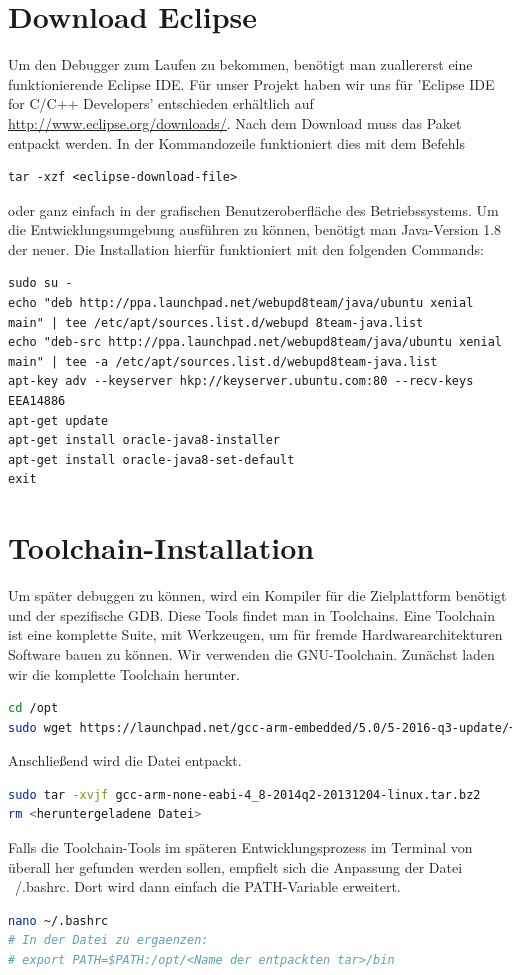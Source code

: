 \section{Download Eclipse}
Um den Debugger zum Laufen zu bekommen, benötigt man zuallererst eine funktionierende Eclipse IDE. Für unser Projekt haben wir uns für 'Eclipse IDE for C/C++ Developers' entschieden erhältlich auf \url{http://www.eclipse.org/downloads/}.
Nach dem Download muss das Paket entpackt werden. In der Kommandozeile funktioniert dies mit dem Befehls 
\begin{lstlisting} 
tar -xzf <eclipse-download-file>
\end{lstlisting}
oder ganz einfach in der grafischen Benutzeroberfläche des Betriebssystems.
Um die Entwicklungsumgebung ausführen zu können, benötigt man Java-Version 1.8 der neuer. 
Die Installation hierfür funktioniert mit den folgenden Commands:
\begin{lstlisting}
sudo su -
echo "deb http://ppa.launchpad.net/webupd8team/java/ubuntu xenial main" | tee /etc/apt/sources.list.d/webupd 8team-java.list
echo "deb-src http://ppa.launchpad.net/webupd8team/java/ubuntu xenial main" | tee -a /etc/apt/sources.list.d/webupd8team-java.list
apt-key adv --keyserver hkp://keyserver.ubuntu.com:80 --recv-keys EEA14886
apt-get update
apt-get install oracle-java8-installer
apt-get install oracle-java8-set-default
exit

\end{lstlisting}
\section{Toolchain-Installation}
Um später debuggen zu können, wird ein Kompiler für die Zielplattform benötigt und der spezifische GDB. Diese Tools findet man in Toolchains. Eine Toolchain ist eine komplette Suite, mit Werkzeugen, um für fremde Hardwarearchitekturen Software bauen zu können.
Wir verwenden die GNU-Toolchain. Zunächst laden wir die komplette Toolchain herunter.
\begin{lstlisting}[language=sh]
cd /opt
sudo wget https://launchpad.net/gcc-arm-embedded/5.0/5-2016-q3-update/+download/gcc-arm-none-eabi-5_4-2016q3-20160926-linux.tar.bz2
\end{lstlisting}
Anschließend wird die Datei entpackt.
\begin{lstlisting}[language=sh]
sudo tar -xvjf gcc-arm-none-eabi-4_8-2014q2-20131204-linux.tar.bz2
rm <heruntergeladene Datei>
\end{lstlisting}
Falls die Toolchain-Tools im späteren Entwicklungsprozess im Terminal von überall her gefunden werden sollen, empfielt sich die Anpassung der Datei ~/.bashrc. Dort wird dann einfach die PATH-Variable erweitert.
\begin{lstlisting}[language=sh]
nano ~/.bashrc
# In der Datei zu ergaenzen:
# export PATH=$PATH:/opt/<Name der entpackten tar>/bin
\end{lstlisting}

